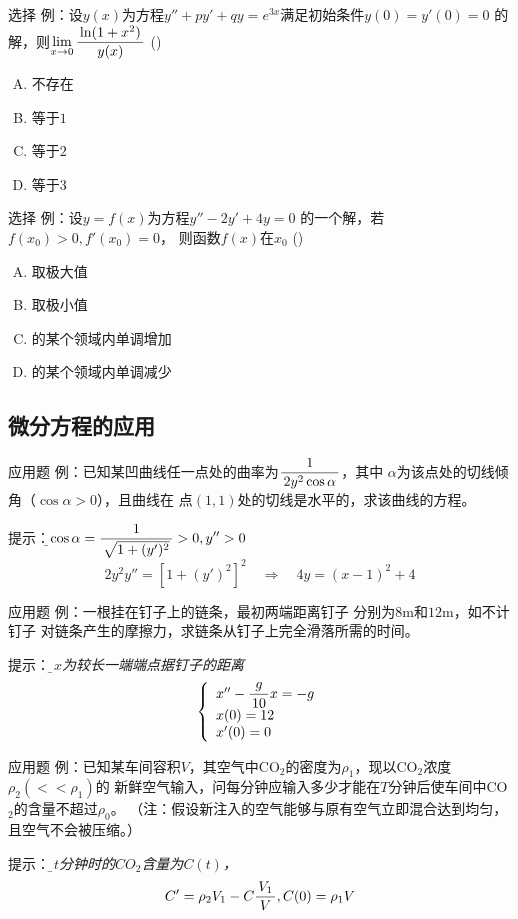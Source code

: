 \begin{frame}{选择}
	\linespread{1.3}
	\alert{例：}设$y(x)$为方程$y''+py'+qy=e^{3x}$满足初始条件$y(0)=y'(0)=0$
	的解，则$\lim\limits_{x\to{0}}\displaystyle\frac{\,{\ln(1+x^2)}\,}{\,{y(x)}\,}$
	(\underline{\;})
	\begin{enumerate}[(A)]
	  \item 不存在
	  \item 等于$1$
	  \item 等于$2$
	  \item 等于$3$
	\end{enumerate}
\end{frame}

\begin{frame}{选择}
	\linespread{1.3}
	\alert{例：}设$y=f(x)$为方程$y''-2y'+4y=0$
	的一个解，若$f(x_0)>0,f'(x_0)=0$，
	则函数$f(x)$在$x_0$
	(\underline{\;})
	\begin{enumerate}[(A)]
	  \item 取极大值
	  \item 取极小值
	  \item 的某个领域内单调增加
	  \item 的某个领域内单调减少
	\end{enumerate}
\end{frame}

\subsection{微分方程的应用}

\begin{frame}{应用题}
	\linespread{1.4}
	\alert{例：}已知某凹曲线任一点处的曲率为$\displaystyle\frac{\,{1}\,}{\,{2y^2\cos\alpha}\,}$，其中
	$\alpha$为该点处的切线倾角（$\cos\alpha>0$），且曲线在
	点$(1,1)$处的切线是水平的，求该曲线的方程。
	
	\pause\alert{提示：}\it\b $\cos\alpha=\displaystyle\frac{\,{1}\,}{\,{\sqrt{1+(y')^2}}\,}>0,
	y''>0$
	$$2y^2y''=[1+(y')^2]^2\quad\Rightarrow\quad
	4y=(x-1)^2+4$$
\end{frame}

\begin{frame}{应用题}
	\linespread{1.2}
	\alert{例：}一根挂在钉子上的链条，最初两端距离钉子
	分别为$8$m和$12$m，如不计钉子
	对链条产生的摩擦力，求链条从钉子上完全滑落所需的时间。
	
	\pause\alert{提示：}\it\b 设$x$为较长一端端点据钉子的距离
	$$\left\{\begin{array}{l}
		x''-\displaystyle\frac{\,{g}\,}{\,{10}\,}x=-g\\
		x(0)=12\\
		x'(0)=0
	\end{array}\right.$$
\end{frame}

\begin{frame}{应用题}
	\linespread{1.2}
	\alert{例：}已知某车间容积$V$，其空气中CO$_2$的密度为$\rho_1$，现以CO$_2$浓度$\rho_2(<<\rho_1)$的
	新鲜空气输入，问每分钟应输入多少才能在$T$分钟后使车间中CO$_2$的含量不超过$\rho_0$。
	（注：假设新注入的空气能够与原有空气立即混合达到均匀，且空气不会被压缩。）

	\pause\alert{提示：}\it\b 设$t$分钟时的$CO_2$含量为$C(t)$，
	$$C'=\rho_2V_1-C\displaystyle\frac{\,{V_1}\,}{\,{V}\,},C(0)=\rho_1V$$
\end{frame}